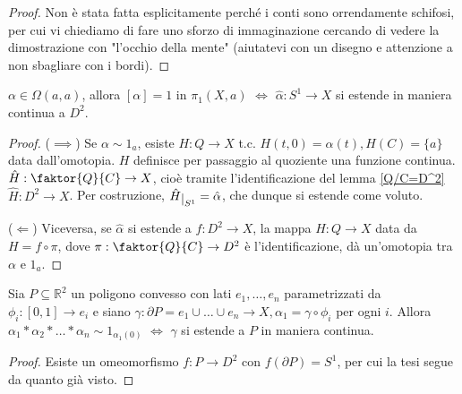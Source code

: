 \begin{proof}
  Non è stata fatta esplicitamente perché i conti sono orrendamente schifosi, per cui vi chiediamo di fare uno sforzo di immaginazione cercando di vedere la dimostrazione con "l'occhio della mente" (aiutatevi con un disegno e attenzione a non sbagliare con i bordi).
\end{proof}

\begin{prop}
  $\alpha \in \Omega(a, a)$, allora $[\alpha]=1$ in $\pi_1(X, a)$ $\Leftrightarrow$ $\hat{\alpha}: S^1 \rightarrow X$ si estende in maniera continua a $D^2$.
\end{prop}

\begin{proof}
  ($\implies$) Se $\alpha \sim 1_a$, esiste $H:Q \rightarrow X$ t.c. $H(t, 0)=\alpha(t), H(C)=\{a\}$ data dall'omotopia. $H$ definisce per passaggio al quoziente una funzione continua. $\hat{H}: \faktor{Q}{C} \rightarrow X$, cioè tramite l'identificazione del lemma \ref{Q/C=D^2} $\hat{H}: D^2 \rightarrow X$. Per costruzione,
  $\hat{H} \restrict{S^1}=\hat{\alpha}$, che dunque si estende come voluto.

  ($\Leftarrow$) Viceversa, se $\hat{\alpha}$ si estende a $f:D^2 \rightarrow X$, la mappa $H: Q \rightarrow X$ data da $H=f \circ \pi$, dove $\pi: \faktor{Q}{C} \rightarrow D^2$ è l'identificazione, dà un'omotopia tra $\alpha$ e $1_a$.
\end{proof}

\begin{cor} \label{pol_est}
  Sia $P \subseteq \mathbb{R}^2$ un poligono convesso con lati $e_1, \dots, e_n$ parametrizzati da $\phi_i: [0, 1] \rightarrow e_i$ e siano $\gamma: \partial P=e_1 \cup \dots \cup e_n \rightarrow X, \alpha_1=\gamma \circ \phi_i$ per ogni $i$. Allora
  $\alpha_1 * \alpha_2 * \dots * \alpha_n \sim 1_{\alpha_1(0)}$ $\Leftrightarrow$ $\gamma$ si estende a $P$ in maniera continua.
\end{cor}

\begin{proof}
  Esiste un omeomorfismo $f: P \rightarrow D^2$ con $f(\partial P)=S^1$, per cui la tesi segue da quanto già visto.
\end{proof}

